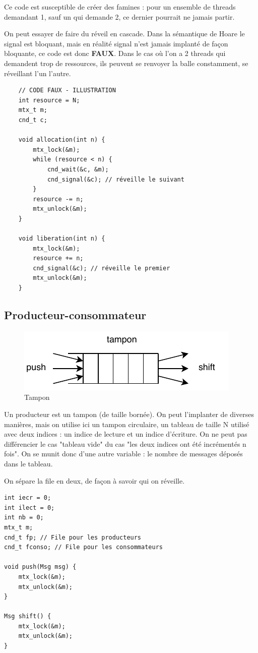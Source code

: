 \documentclass[11pt]{article}
\begin{document}
Ce code est susceptible de créer des famines : pour un ensemble de threads demandant 1, sauf un qui demande 2, ce dernier pourrait ne jamais partir.

On peut essayer de faire du réveil en cascade. Dans la sémantique de Hoare le signal est bloquant, mais en réalité signal n'est jamais implanté de façon bloquante, ce code est donc \textbf{FAUX}. Dans le cas où l'on a 2 threads qui demandent trop de ressources, ils peuvent se renvoyer la balle constamment, se réveillant l'un l'autre.
\begin{verbatim}
    // CODE FAUX - ILLUSTRATION
    int resource = N;
    mtx_t m;
    cnd_t c;

    void allocation(int n) {
        mtx_lock(&m);
        while (resource < n) {
            cnd_wait(&c, &m);
            cnd_signal(&c); // réveille le suivant
        }
        resource -= n;
        mtx_unlock(&m);
    }

    void liberation(int n) {
        mtx_lock(&m);
        resource += n;
        cnd_signal(&c); // réveille le premier
        mtx_unlock(&m);
    }
\end{verbatim}

\subsection{Producteur-consommateur}

\begin{figure}[ht]
    \centering
    \includegraphics{img/cours5/tampon.pdf}
    \caption{Tampon}
\end{figure}
Un producteur est un tampon (de taille bornée). On peut l'implanter de diverses manières, mais on utilise ici un tampon circulaire, un tableau de taille N utilisé avec deux indices : un indice de lecture et un indice d'écriture. On ne peut pas différencier le cas "tableau vide" du cas "les deux indices ont été incrémentés n fois". On se munit donc d'une autre variable : le nombre de messages déposés dans le tableau.

On sépare la file en deux, de façon à savoir qui on réveille.

\begin{verbatim}
int iecr = 0;
int ilect = 0;
int nb = 0;
mtx_t m;
cnd_t fp; // File pour les producteurs
cnd_t fconso; // File pour les consommateurs

void push(Msg msg) {
    mtx_lock(&m);
    mtx_unlock(&m);
}

Msg shift() {
    mtx_lock(&m);
    mtx_unlock(&m);
}
\end{verbatim}
\end{document}
